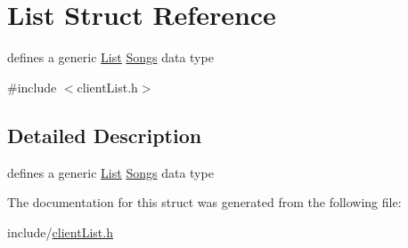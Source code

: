 \hypertarget{structList}{\section{List Struct Reference}
\label{structList}
}


defines a generic \hyperlink{structList}{List} \hyperlink{structSongs}{Songs} data type  




{\ttfamily \#include $<$client\-List.\-h$>$}



\subsection{Detailed Description}
defines a generic \hyperlink{structList}{List} \hyperlink{structSongs}{Songs} data type 

The documentation for this struct was generated from the following file\-:\begin{DoxyCompactItemize}
\item 
include/\hyperlink{clientList_8h}{client\-List.\-h}\end{DoxyCompactItemize}

